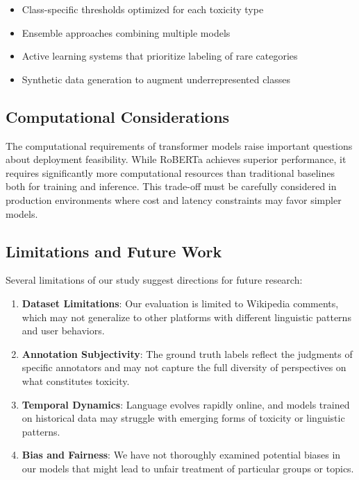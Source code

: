 \documentclass[11pt]{article}
\begin{document}
\begin{itemize}
    \item Class-specific thresholds optimized for each toxicity type
    \item Ensemble approaches combining multiple models
    \item Active learning systems that prioritize labeling of rare categories
    \item Synthetic data generation to augment underrepresented classes
\end{itemize}

\subsection{Computational Considerations}

The computational requirements of transformer models raise important questions about deployment feasibility. While RoBERTa achieves superior performance, it requires significantly more computational resources than traditional baselines both for training and inference. This trade-off must be carefully considered in production environments where cost and latency constraints may favor simpler models.

\subsection{Limitations and Future Work}

Several limitations of our study suggest directions for future research:

\begin{enumerate}
    \item \textbf{Dataset Limitations}: Our evaluation is limited to Wikipedia comments, which may not generalize to other platforms with different linguistic patterns and user behaviors.
    
    \item \textbf{Annotation Subjectivity}: The ground truth labels reflect the judgments of specific annotators and may not capture the full diversity of perspectives on what constitutes toxicity.
    
    \item \textbf{Temporal Dynamics}: Language evolves rapidly online, and models trained on historical data may struggle with emerging forms of toxicity or linguistic patterns.
    
    \item \textbf{Bias and Fairness}: We have not thoroughly examined potential biases in our models that might lead to unfair treatment of particular groups or topics.
\end{enumerate}
\end{document}
